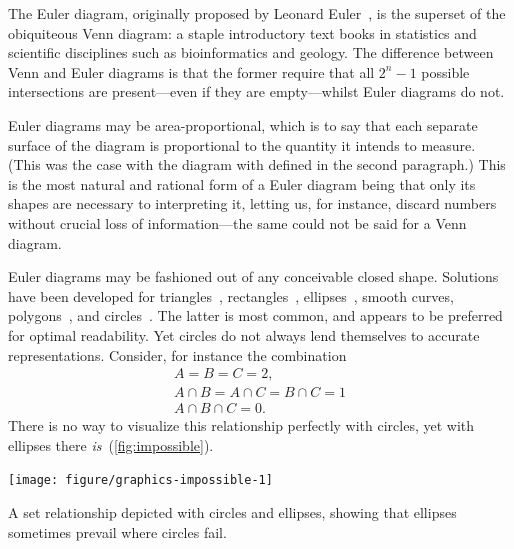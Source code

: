 \documentclass[
  a4paper,
  nofonts,
  nobib,
  titlepage,
  justified,
  marginals=raggedouter,
  nohyper
]{tufte-handout}\usepackage[]{graphicx}\usepackage[]{color}
\newenvironment{knitrout}{}{} %
\begin{document}

The Euler diagram, originally proposed by Leonard Euler~\citep{euler_1802},
is the superset of the obiquiteous Venn diagram: a staple introductory
text books in statistics and scientific disciplines such as
bioinformatics and geology. The difference between Venn and Euler diagrams is
that the former require that all $2^n-1$ possible intersections are
present---even if they are empty---whilst Euler diagrams do not.

Euler diagrams may be area-proportional, which is to say that each separate
surface of the diagram is proportional to the quantity it intends to measure.
(This was the case with the diagram with defined in the second paragraph.)
This is the most natural and rational form of a Euler diagram being that only
its shapes are necessary to interpreting it, letting us, for instance,
discard numbers without crucial loss of information---the same could not be
said for a Venn diagram.

Euler diagrams may be fashioned out of any conceivable closed shape.
Solutions have been developed for triangles~\citep{swinton_2011},
rectangles~\citep{swinton_2011}, ellipses~\citep{micallef_2014},
smooth curves, polygons~\citep{swinton_2011}, and
circles~\citep{wilkinson_2012,kestler_2008,swinton_2011}. The latter is
most common, and appears to be preferred for optimal
readability. Yet circles do not always lend themselves to
accurate representations. Consider, for instance the combination
\[
\begin{gathered}
A = B = C = 2,\\
A \cap B = A \cap C = B \cap C = 1\\
A \cap B \cap C = 0.
\end{gathered}
\]
There is no way to visualize this relationship perfectly with circles,
yet with ellipses there \emph{is}~(\cref{fig:impossible}).
\begin{marginfigure}
\begin{knitrout}
\color{fgcolor}

{\centering \texttt{[image: figure/graphics-impossible-1]} 

}



\end{knitrout}
\caption{A set relationship depicted with circles and ellipses, showing that ellipses sometimes prevail where circles fail.}
\label{fig:impossible}
\end{marginfigure}
\end{document}
